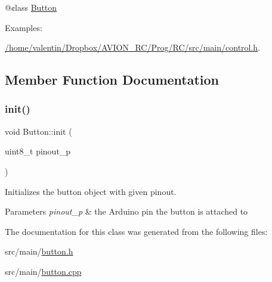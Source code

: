 @¢lass \hyperlink{class_button}{Button} \begin{Desc}
\item[Examples\+: ]\par
\hyperlink{_2home_2valentin_2_dropbox_2_a_v_i_o_n__r_c_2_prog_2_r_c_2src_2main_2control_8h-example}{/home/valentin/\+Dropbox/\+A\+V\+I\+O\+N\+\_\+\+R\+C/\+Prog/\+R\+C/src/main/control.\+h}.\end{Desc}


\subsection{Member Function Documentation}
\mbox{\label{class_button_a5768906065b7f1d4d146f1d9fc5ce890}} 
\subsubsection{\texorpdfstring{init()}{init()}}
{\footnotesize\ttfamily void Button\+::init (\begin{DoxyParamCaption}\item[{uint8\+\_\+t}]{pinout\+\_\+p }\end{DoxyParamCaption})}



Initializes the button object with given pinout. 


\begin{DoxyParams}{Parameters}
{\em pinout\+\_\+p} & the Arduino pin the button is attached to \\
\hline
\end{DoxyParams}


The documentation for this class was generated from the following files\+:\begin{DoxyCompactItemize}
\item 
src/main/\hyperlink{button_8h}{button.\+h}\item 
src/main/\hyperlink{button_8cpp}{button.\+cpp}\end{DoxyCompactItemize}
